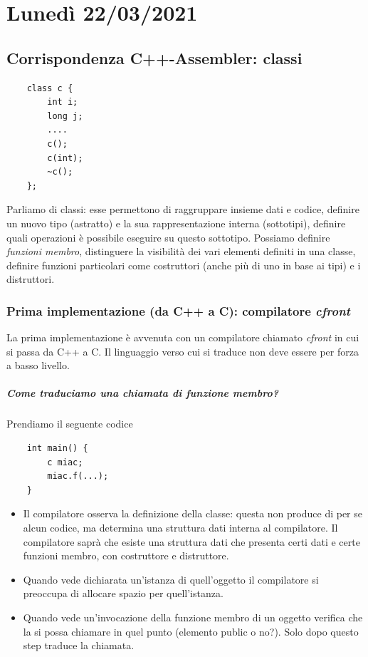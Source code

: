 
\chapter{Lunedì 22/03/2021}
\section{Corrispondenza C++-Assembler: classi}
\begin{verbatim}
	class c {
		int i;
		long j;
		....
		c();
		c(int);
		~c();
	};
\end{verbatim}
Parliamo di classi: esse permettono di raggruppare insieme dati e codice, definire un nuovo tipo (astratto) e la sua rappresentazione interna (sottotipi), definire quali operazioni è possibile eseguire su questo sottotipo.
Possiamo definire \emph{funzioni membro}, distinguere la visibilità dei vari elementi definiti in una classe, definire funzioni particolari come costruttori (anche più di uno in base ai tipi) e i distruttori.
\subsection{Prima implementazione (da C++ a C): compilatore \emph{cfront}} La prima implementazione è avvenuta con un compilatore chiamato \emph{cfront} in cui si passa da C++ a C. Il linguaggio verso cui si traduce non deve essere per forza a basso livello.
\paragraph{Come traduciamo una chiamata di funzione membro?} Prendiamo il seguente codice
\begin{verbatim}
	int main() {
		c miac;
		miac.f(...);
	}
\end{verbatim}
\begin{itemize}
	\item Il compilatore osserva la definizione della classe: questa non produce di per se alcun codice, ma determina una struttura dati interna al compilatore. Il compilatore saprà che esiste una struttura dati che presenta certi dati e certe funzioni membro, con costruttore e distruttore.
	\item Quando vede dichiarata un'istanza di quell'oggetto il compilatore si preoccupa di allocare spazio per quell'istanza.
	\item Quando vede un'invocazione della funzione membro di un oggetto verifica che la si possa chiamare in quel punto (elemento public o no?). Solo dopo questo step traduce la chiamata.
\end{itemize}

